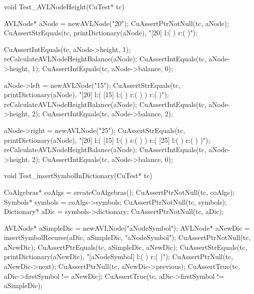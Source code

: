 void Test_AVLNodeHeight(CuTest* tc) {
  AVLNode* aNode = newAVLNode("20");
  CuAssertPtrNotNull(tc, aNode);
  CuAssertStrEquals(tc, printDictionary(aNode),
  "[20] l:(  ) r:(  )");

  CuAssertIntEquals(tc, aNode->height, 1);
  reCalculateAVLNodeHeightBalance(aNode);
  CuAssertIntEquals(tc, aNode->height, 1);
  CuAssertIntEquals(tc, aNode->balance, 0);

  aNode->left = newAVLNode("15");
  CuAssertStrEquals(tc, printDictionary(aNode),
  "[20] l:( [15] l:(  ) r:(  )  ) r:(  )");
  reCalculateAVLNodeHeightBalance(aNode);
  CuAssertIntEquals(tc, aNode->height, 2);
  CuAssertIntEquals(tc, aNode->balance, 2);

  aNode->right = newAVLNode("25");
  CuAssertStrEquals(tc, printDictionary(aNode),
  "[20] l:( [15] l:(  ) r:(  )  ) r:( [25] l:(  ) r:(  )  )");
  reCalculateAVLNodeHeightBalance(aNode);
  CuAssertIntEquals(tc, aNode->height, 2);
  CuAssertIntEquals(tc, aNode->balance, 0);
}

void Test_insertSymbolInDictionary(CuTest* tc) {
  CoAlgebras* coAlgs = createCoAlgebras();
  CuAssertPtrNotNull(tc, coAlgs);
  Symbols* symbols = coAlgs->symbols;
  CuAssertPtrNotNull(tc, symbols);
  Dictionary* aDic = symbols->dictionary;
  CuAssertPtrNotNull(tc, aDic);

  AVLNode* aSimpleDic = newAVLNode("aNodeSymbol");
  AVLNode* aNewDic = insertSymbolRecurse(aDic, aSimpleDic, "aNodeSymbol");
  CuAssertPtrNotNull(tc, aNewDic);
  CuAssertPtrEquals(tc, aSimpleDic, aNewDic);
  CuAssertStrEquals(tc, printDictionary(aNewDic),
  "[aNodeSymbol] l:(  ) r:(  )");
  CuAssertPtrNull(tc, aNewDic->next);
  CuAssertPtrNull(tc, aNewDic->previous);
  CuAssertTrue(tc, aDic->firstSymbol != aNewDic);
  CuAssertTrue(tc, aDic->firstSymbol != aSimpleDic);
}

